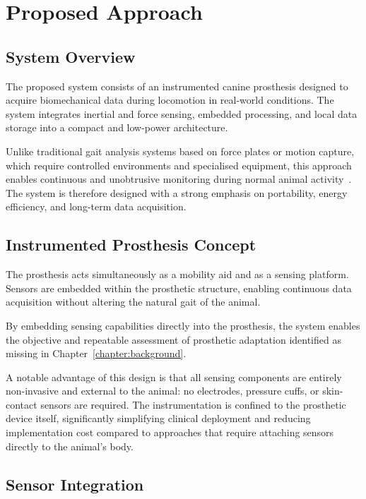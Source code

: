 \chapter{Proposed Approach}
\label{chapter:proposed}

\section{System Overview}

The proposed system consists of an instrumented canine prosthesis designed to
acquire biomechanical data during locomotion in real-world conditions.
The system integrates inertial and force sensing, embedded processing, and
local data storage into a compact and low-power architecture.

Unlike traditional gait analysis systems based on force plates or motion
capture, which require controlled environments and specialised equipment, this
approach enables continuous and unobtrusive monitoring during normal animal
activity~\cite{McLaughlin2001}.
The system is therefore designed with a strong emphasis on portability, energy
efficiency, and long-term data acquisition.

\section{Instrumented Prosthesis Concept}

The prosthesis acts simultaneously as a mobility aid and as a sensing platform.
Sensors are embedded within the prosthetic structure, enabling continuous data
acquisition without altering the natural gait of the animal.

By embedding sensing capabilities directly into the prosthesis, the system
enables the objective and repeatable assessment of prosthetic adaptation
identified as missing in Chapter~\ref{chapter:background}.

A notable advantage of this design is that all sensing components are entirely
non-invasive and external to the animal: no electrodes, pressure cuffs, or
skin-contact sensors are required. The instrumentation is confined to the
prosthetic device itself, significantly simplifying clinical deployment and
reducing implementation cost compared to approaches that require attaching
sensors directly to the animal's body.

\section{Sensor Integration}

